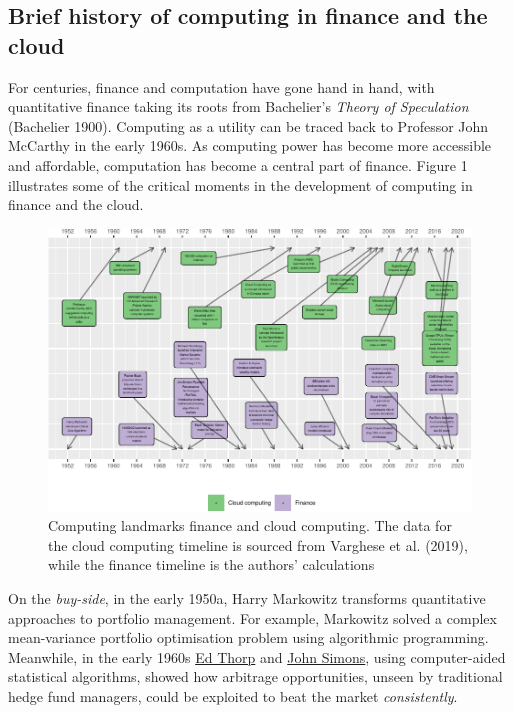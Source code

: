 \documentclass{article}
\begin{document}
\hypertarget{brief-history-of-computing-in-finance-and-the-cloud}{%
\subsection{Brief history of computing in finance and the
cloud}\label{brief-history-of-computing-in-finance-and-the-cloud}}

For centuries, finance and computation have gone hand in hand, with
quantitative finance taking its roots from Bachelier's \emph{Theory of
Speculation} (Bachelier 1900). Computing as a utility can be traced back
to Professor John McCarthy in the early 1960s. As computing power has
become more accessible and affordable, computation has become a central
part of finance. Figure 1 illustrates some of the critical moments in
the development of computing in finance and the cloud.

\begin{figure}

{\centering \includegraphics[width=1\linewidth]{qrap_files/figure-latex/timeline-1} 

}

\caption{ Computing landmarks finance and cloud computing.   The data for the cloud computing timeline is sourced from Varghese et al. (2019), while the finance timeline is the authors' calculations}\label{fig:timeline}
\end{figure}

On the \emph{buy-side}, in the early 1950a, Harry Markowitz transforms
quantitative approaches to portfolio management. For example, Markowitz
solved a complex mean-variance portfolio optimisation problem using
algorithmic programming. Meanwhile, in the early 1960s
\href{https://en.wikipedia.org/wiki/Edward_O._Thorp}{Ed Thorp} and
\href{https://en.wikipedia.org/wiki/Jim_Simons_(mathematician)}{John
Simons}, using computer-aided statistical algorithms, showed how
arbitrage opportunities, unseen by traditional hedge fund managers,
could be exploited to beat the market \emph{consistently}.
\end{document}
